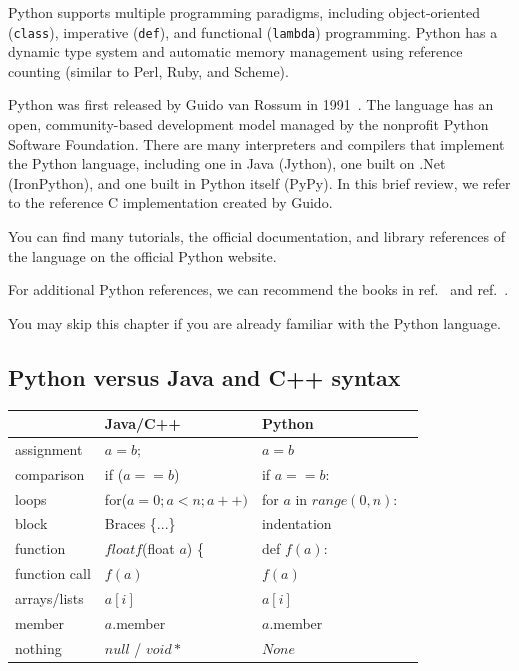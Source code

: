 \documentclass[justified,sixbynine]{tufte-book}
\def\ft{\small\tt}
\theoremstyle{plain}%
\theoremstyle{definition}
\theoremstyle{remark}
\begin{document}
\begin{fullwidth}
Python supports multiple programming paradigms, including object-oriented ({\ft class}), imperative ({\ft def}), and functional ({\ft lambda}) programming. Python has a dynamic type system and automatic memory management using reference counting (similar to Perl, Ruby, and Scheme).

Python was first released by Guido van Rossum in 1991~\cite{guido}. The language has an open, community-based development model managed by the nonprofit Python Software Foundation. There are many interpreters and compilers that implement the Python language, including one in Java (Jython), one built on .Net (IronPython), and one built in Python itself (PyPy). In this brief review, we refer to the reference C implementation created by Guido.

You can find many tutorials, the official documentation, and library references of the language on the official Python website.~\cite{python}

For additional Python references, we can recommend the books in ref.~\cite{guido}  and ref.~\cite{lutz}.

You may skip this chapter if you are already familiar with the Python language.

\goodbreak\subsection{Python versus Java and C++ syntax}


\begin{center}
\begin{tabular}{|l|l|l|l|}
\hline
& {\bf Java/C++} & {\bf Python} \\ \hline
assignment & $a=b;$ & $a=b$ \\ \hline
comparison & if ($a==b$) & if $a==b$: \\ \hline
loops & for($a=0;a<n;a++)$ & for $a$ in $range(0,n)$: \\ \hline
block & Braces \{...\} & indentation \\ \hline
function & $float f$(float $a$) \{ & def $f(a)$: \\ \hline
function call & $f(a)$ & $f(a)$ \\ \hline
arrays/lists & $a[i]$ & $a[i]$ \\ \hline
member & $a$.member & $a$.member \\ \hline
nothing & $null$ / $void*$ & $None$ \\ \hline
\end{tabular}
\end{center}


\end{fullwidth}
\end{document}
